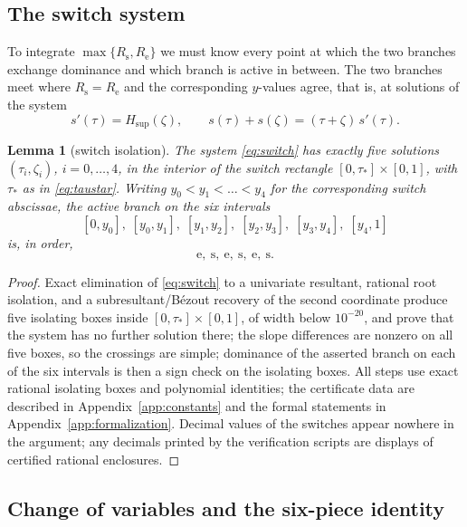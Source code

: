\documentclass[11pt]{article}
\theoremstyle{plain}
\newtheorem{lemma}[theorem]{Lemma}
\theoremstyle{definition}
\theoremstyle{remark}
\newcommand{\Rsta}{R_{\mathrm{s}}}
\newcommand{\Rend}{R_{\mathrm{e}}}
\newcommand{\Hsup}{H_{\mathrm{sup}}}
\begin{document}
\subsection{The switch system}

To integrate $\max\{\Rsta,\Rend\}$ we must know every point at which the two
branches exchange dominance and which branch is active in between. The two
branches meet where $\Rsta=\Rend$ and the corresponding $y$-values agree, that
is, at solutions of the system
\begin{equation}\label{eq:switch}
  s'(\tau)=\Hsup(\zeta),
  \qquad
  s(\tau)+s(\zeta)=(\tau+\zeta)\,s'(\tau).
\end{equation}

\begin{lemma}[switch isolation]\label{lem:switch}
The system \eqref{eq:switch} has exactly five solutions
$(\tau_{i},\zeta_{i})$, $i=0,\dots,4$, in the interior of the switch rectangle
$[0,\tau_{*}]\times[0,1]$, with $\tau_{*}$ as in \eqref{eq:taustar}. Writing
$y_{0}<y_{1}<\dots<y_{4}$ for the corresponding switch abscissae, the active
branch on the six intervals
\[
  [0,y_{0}],\;[y_{0},y_{1}],\;[y_{1},y_{2}],\;
  [y_{2},y_{3}],\;[y_{3},y_{4}],\;[y_{4},1]
\]
is, in order,
\[
  \mathrm{e},\ \mathrm{s},\ \mathrm{e},\ \mathrm{s},\ \mathrm{e},\ \mathrm{s}.
\]
\end{lemma}

\begin{proof}
Exact elimination of \eqref{eq:switch} to a univariate resultant, rational root
isolation, and a subresultant/B\'ezout recovery of the second coordinate produce
five isolating boxes inside $[0,\tau_{*}]\times[0,1]$, of width below
$10^{-20}$, and prove that the system has no further solution there; the slope
differences are nonzero on all five boxes, so the crossings are simple; dominance of the
asserted branch on each of the six intervals is then a sign check on the
isolating boxes. All steps use exact rational isolating boxes and polynomial
identities; the certificate data are described in Appendix~\ref{app:constants}
and the formal statements in Appendix~\ref{app:formalization}. Decimal values of
the switches appear nowhere in the argument; any decimals printed by the
verification scripts are displays of certified rational enclosures.
\end{proof}

\subsection{Change of variables and the six-piece identity}
\end{document}
